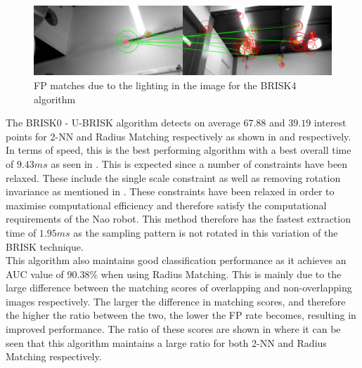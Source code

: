 \documentclass{report}
\begin{document}
\begin{figure}
  \centering
    \includegraphics[width=1.0\textwidth]{../Drawings/problems/LightingBrisk4.jpg}
    \caption{FP matches due to the lighting in the image for the BRISK4 algorithm} 
    \label{fig:duplicateMatchesBrisk4}
\end{figure}

The BRISK0 - U-BRISK algorithm detects on average $67.88$ and $39.19$ interest points for 2-NN and Radius Matching respectively as shown in  and  respectively. In terms of speed, this is the best performing algorithm with a best overall time of $9.43 ms$ as seen in .  This is expected since a number of constraints have been relaxed. These include the single scale constraint as well as removing rotation invariance as mentioned in . These constraints have been relaxed in order to maximise computational efficiency and therefore satisfy the computational requirements of the Nao robot. This method therefore has the fastest extraction time of $1.95 ms$ as the sampling pattern is not rotated in this variation of the BRISK technique. \\


This algorithm also maintains good classification performance as it achieves an AUC value of $90.38\%$ when using Radius Matching. This is mainly due to the large difference between the matching scores of overlapping and non-overlapping images respectively. The larger the difference in matching scores, and therefore the higher the ratio between the two, the lower the FP rate becomes, resulting in improved performance. The ratio of these scores are shown in  where it can be seen that this algorithm maintains a large ratio for both 2-NN and Radius Matching respectively.\\
\end{document}
